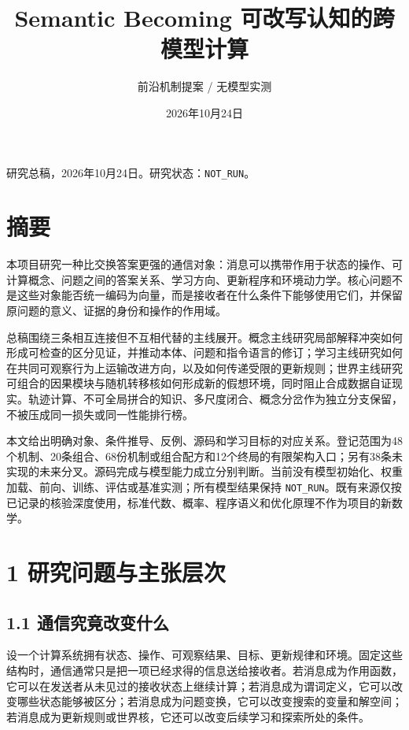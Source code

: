 \documentclass[
  10pt,
]{article}
\title{Semantic Becoming 可改写认知的跨模型计算}
\subtitle{前沿机制提案 / 无模型实测}
\author{}
\date{2026年10月24日}
\begin{document}
\maketitle

{
\setcounter{tocdepth}{1}
\tableofcontents
}
研究总稿，2026年10月24日。研究状态：\nolinkurl{NOT_RUN}。

\section{摘要}\label{ux6458ux8981}

本项目研究一种比交换答案更强的通信对象：消息可以携带作用于状态的操作、可计算概念、问题之间的答案关系、学习方向、更新程序和环境动力学。核心问题不是这些对象能否统一编码为向量，而是接收者在什么条件下能够使用它们，并保留原问题的意义、证据的身份和操作的作用域。

总稿围绕三条相互连接但不互相代替的主线展开。概念主线研究局部解释冲突如何形成可检查的区分见证，并推动本体、问题和指令语言的修订；学习主线研究如何在共同可观察行为上运输改进方向，以及如何传递受限的更新规则；世界主线研究可组合的因果模块与随机转移核如何形成新的假想环境，同时阻止合成数据自证现实。轨迹计算、不可全局拼合的知识、多尺度闭合、概念分岔作为独立分支保留，不被压成同一损失或同一性能排行榜。

本文给出明确对象、条件推导、反例、源码和学习目标的对应关系。登记范围为48个机制、20条组合、68份机制或组合配方和12个终局的有限架构入口；另有38条未实现的未来分叉。源码完成与模型能力成立分别判断。当前没有模型初始化、权重加载、前向、训练、评估或基准实测；所有模型结果保持
\nolinkurl{NOT_RUN}。既有来源仅按已记录的核验深度使用，标准代数、概率、程序语义和优化原理不作为项目的新数学。

\section{1
研究问题与主张层次}\label{ux7814ux7a76ux95eeux9898ux4e0eux4e3bux5f20ux5c42ux6b21}

\subsection{1.1
通信究竟改变什么}\label{ux901aux4fe1ux7a76ux7adfux6539ux53d8ux4ec0ux4e48}

设一个计算系统拥有状态、操作、可观察结果、目标、更新规律和环境。固定这些结构时，通信通常只是把一项已经求得的信息送给接收者。若消息成为作用函数，它可以在发送者从未见过的接收状态上继续计算；若消息成为谓词定义，它可以改变哪些状态能够被区分；若消息成为问题变换，它可以改变搜索的变量和解空间；若消息成为更新规则或世界核，它还可以改变后续学习和探索所处的条件。
\end{document}
